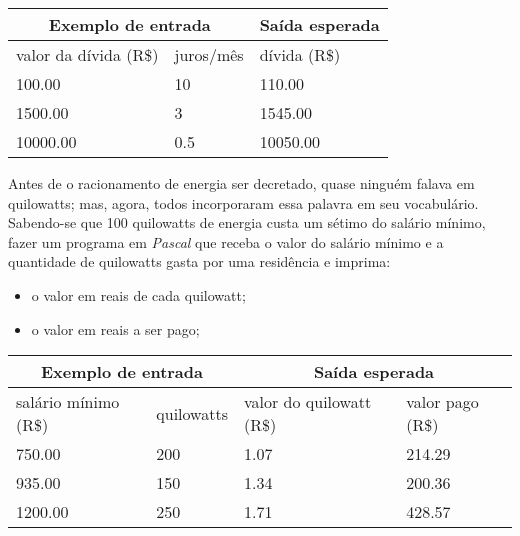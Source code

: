 \begin{center}
\begin{tabular}{|l|l|l|} \hline
\multicolumn{2}{|c|}{Exemplo de entrada} & Saída esperada \\ \hline
valor da dívida (R\$) & juros/mês & dívida (R\$) \\ \hline
100.00 & 10  & 110.00            \\ \hline
1500.00 & 3 &  1545.00          \\ \hline
10000.00 & 0.5 & 10050.00          \\ \hline
\end{tabular}
\end{center}

\item Antes de o racionamento de energia ser decretado, quase ninguém falava 
em quilowatts; mas, agora, todos incorporaram essa palavra em seu vocabulário. 
Sabendo-se que 100 quilowatts de energia custa um sétimo do salário mínimo, 
fazer um programa em \emph{Pascal} que receba o valor do salário mínimo e a 
quantidade de quilowatts gasta por uma residência e imprima:
\begin{itemize}
\item o valor em reais de cada quilowatt;
\item o valor em reais a ser pago;
\end{itemize}

\begin{center}
\begin{tabular}{|l|l|l|l|} \hline
\multicolumn{2}{|c|}{Exemplo de entrada} & \multicolumn{2}{|c|}{Saída esperada} \\ \hline
salário mínimo (R\$) & quilowatts & valor do quilowatt (R\$) & valor pago (R\$) \\ \hline
750.00 & 200 & 1.07 & 214.29           \\ \hline
935.00 & 150 & 1.34 & 200.36         \\ \hline
1200.00 & 250 & 1.71 & 428.57        \\ \hline
\end{tabular}
\end{center}

